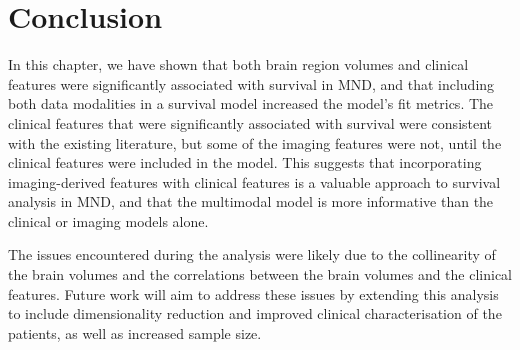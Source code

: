 \section{Conclusion}

In this chapter, we have shown that both brain region volumes and clinical features were significantly associated with survival in MND, and that including both data modalities in a survival model increased the model's fit metrics.
The clinical features that were significantly associated with survival were consistent with the existing literature, but some of the imaging features were not, until the clinical features were included in the model.
This suggests that incorporating imaging-derived features with clinical features is a valuable approach to survival analysis in MND, and that the multimodal model is more informative than the clinical or imaging models alone.

The issues encountered during the analysis were likely due to the collinearity of the brain volumes and the correlations between the brain volumes and the clinical features.
Future work will aim to address these issues by extending this analysis to include dimensionality reduction and improved clinical characterisation of the patients, as well as increased sample size.